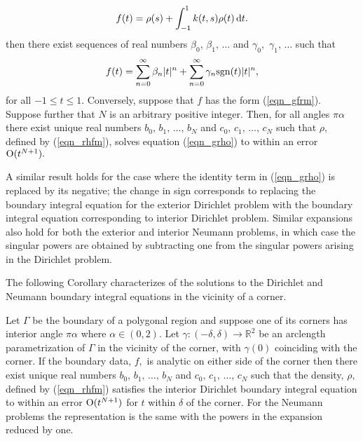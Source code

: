 \begin{theorem}
\begin{align}
f(t) = \rho(s) +\int_{-1}^1 k(t,s)  \rho(t)\,{\rm d}t.
\label{eqn_grho}
\end{align}
then there exist sequences of real numbers $\beta_0$, $\beta_1,\,\dots$ and $\gamma_0,$ $\gamma_1,\,\dots$ such that
\begin{align}
f(t) = \sum_{n=0}^\infty\beta_n |t|^n + \sum_{n=0}^\infty \gamma_n {\rm sgn}(t) |t|^n,
\label{eqn_gfrm}
\end{align}
for all $-1 \le t \le 1.$ Conversely, suppose that $f$ has the form (\ref{eqn_gfrm}). Suppose further that $N$ is an arbitrary positive integer. Then, for all angles $\pi \alpha$ there exist unique real numbers $b_0,\,b_1,\,\dots,\,b_N$ and $c_0,\,c_1,\,\dots,\,c_N$ such that $\rho,$ defined by (\ref{eqn_rhfm}), solves equation  (\ref{eqn_grho}) to within an error ${\rm O}(t^{N+1}).$ 
\end{theorem}
\begin{remark1}
A similar result holds for the case where the identity term in (\ref{eqn_grho}) is replaced by its negative; the change in sign corresponds to replacing the boundary integral equation for the exterior Dirichlet problem with the boundary integral equation corresponding to interior Dirichlet problem. Similar expansions also hold for both the exterior and interior Neumann problems, in which case the singular powers are obtained by subtracting one from the singular powers arising in the Dirichlet problem.
\end{remark1}


The following Corollary characterizes of the solutions to the Dirichlet and Neumann boundary integral equations in the vicinity of a corner.

\begin{corollary}
Let $\Gamma$ be the boundary of a polygonal region and suppose one of its corners has interior angle $\pi \alpha$ where $\alpha \in (0,2).$ Let $\gamma:(-\delta,\delta) \rightarrow \mathbb{R}^2$ be an arclength parametrization of $\Gamma$ in the vicinity of the corner, with $\gamma(0)$ coinciding with the corner. If the boundary data, $f,$ is analytic on either side of the corner then there exist unique real numbers $b_0,\,b_1,\,\dots,\,b_N$ and $c_0,\,c_1,\,\dots,\,c_N$ such that the density, $\rho,$ defined by (\ref{eqn_rhfm}) satisfies the interior Dirichlet boundary integral equation to within an error ${\rm O}(t^{N+1})$ for $t$ within $\delta$ of the corner. For the Neumann problems the representation is the same with the powers in the expansion reduced by one.
\end{corollary}
